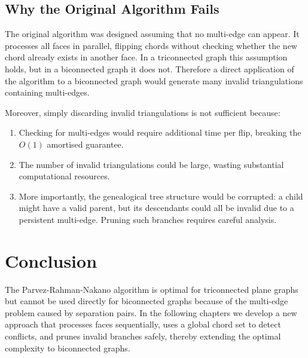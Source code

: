 \subsection{Why the Original Algorithm Fails}
\label{subsec:original_fails}

The original algorithm was designed assuming that no multi-edge can appear. 
It processes all faces in parallel, flipping chords without checking whether the new chord already exists in another face. 
In a triconnected graph this assumption holds, but in a biconnected graph it does not. 
Therefore a direct application of the algorithm to a biconnected graph would generate many invalid triangulations containing multi-edges.

Moreover, simply discarding invalid triangulations is not sufficient because:
\begin{enumerate}
    \item Checking for multi-edges would require additional time per flip, breaking the \(O(1)\) amortised guarantee.
    \item The number of invalid triangulations could be large, wasting substantial computational resources.
    \item More importantly, the genealogical tree structure would be corrupted: a child might have a valid parent, but its descendants could all be invalid due to a persistent multi-edge. Pruning such branches requires careful analysis.
\end{enumerate}

\section{Conclusion}
\label{sec:paper_conclusion}

The Parvez-Rahman-Nakano algorithm is optimal for triconnected plane graphs but cannot be used directly for biconnected graphs because of the multi-edge problem caused by separation pairs. 
In the following chapters we develop a new approach that processes faces sequentially, uses a global chord set to detect conflicts, and prunes invalid branches safely, thereby extending the optimal complexity to biconnected graphs.